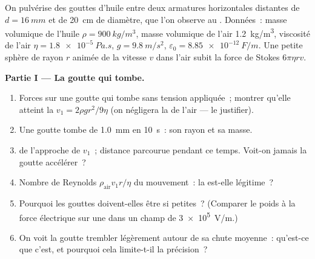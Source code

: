 \begin{problem}
\label{pb:b1:potential-capacitors:1}
On pulvérise des gouttes d'huile entre deux armatures horizontales distantes
de $d = \qty{16}{mm}$ et de \qty{20}{cm} de diamètre, que l'on observe au
. Données~: masse volumique de l'huile $\rho = \qty{900}{kg/m^3}$,
masse volumique de l'air \qty{1.2}{kg/m^3}, viscosité de l'air $\eta = \qty{1.8e-5}{Pa.s}$, $g =
\qty{9.8}{m/s^2}$, $\varepsilon_0 = \qty{8.85e-12}{F/m}$. Une petite sphère de
rayon $r$ animée de la vitesse $v$ dans l'air subit la force de Stokes $6\pi\eta rv$.

\medskip
\noindent\textbf{Partie I --- La goutte qui tombe.}
\begin{enumerate}
  \item Forces sur une goutte qui tombe sans tension appliquée~; montrer
        qu'elle atteint la  $v_1 = 2\rho gr^2/9\eta$ (on négligera
        la  de l'air --- le justifier).
  \item Une goutte tombe de \qty{1.0}{mm} en \qty{10}{s}~: son rayon et sa masse.
  \item {} de l'approche de $v_1$~; distance parcourue
        pendant ce temps. Voit-on jamais la goutte accélérer~?
  \item Nombre de Reynolds $\rho_{\text{air}}v_1r/\eta$ du mouvement~: la  est-elle légitime~?
  \item Pourquoi les gouttes doivent-elles être si petites~? (Comparer le
        poids à la force électrique sur une  dans un champ
        de \qty{3e5}{V/m}.)
  \item On voit la goutte trembler légèrement autour de sa chute moyenne~:
        qu'est-ce que c'est, et pourquoi cela limite-t-il la précision~?
\end{enumerate}


\end{problem}
